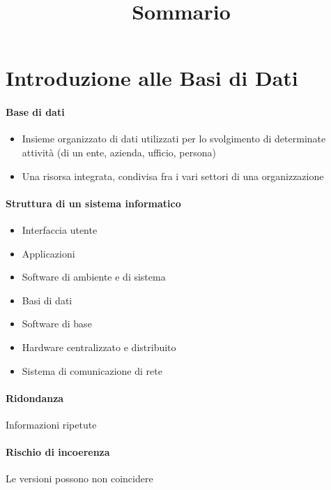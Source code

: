 \documentclass[12pt]{article}
\title{Sommario}
\author{}
\date{}
\begin{document}
    \maketitle
    \section{Introduzione alle Basi di Dati}
    \paragraph{Base di dati}
    \begin{itemize}
        \item Insieme organizzato di dati utilizzati per lo svolgimento di determinate attività (di un ente, azienda, ufficio, persona)
        \item Una risorsa integrata, condivisa fra i vari settori di una organizzazione
    \end{itemize}
    \paragraph{Struttura di un sistema informatico}
    \begin{itemize}
        \item Interfaccia utente
        \item Applicazioni
        \item Software di ambiente e di sistema
        \item Basi di dati
        \item Software di base 
        \item Hardware centralizzato e distribuito
        \item Sistema di comunicazione di rete
    \end{itemize}
    \paragraph{Ridondanza}
    Informazioni ripetute
    \paragraph{Rischio di incoerenza}
    Le versioni possono non coincidere
    \newpage
\end{document}
